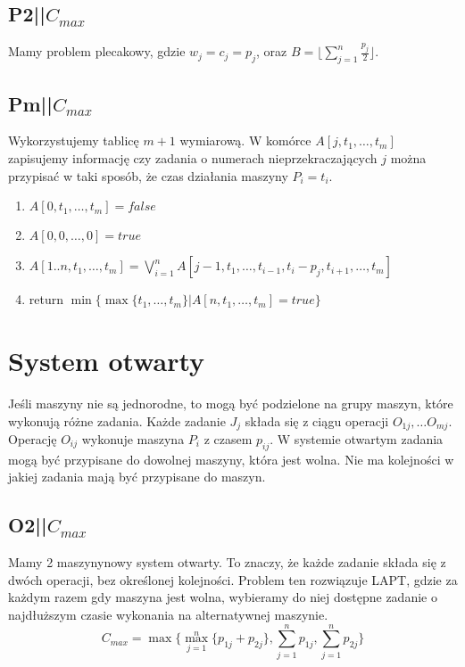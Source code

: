 \documentclass{../notatki}
\begin{document}
\subsection{P2||\texorpdfstring{$C_{max}$}{Cmax}}

Mamy problem plecakowy, gdzie $w_j = c_j = p_j$, oraz $B = \lfloor
\sum_{j=1}^{n} \frac{p_j}{2} \rfloor$.

\subsection{Pm||\texorpdfstring{$C_{max}$}{Cmax}}

Wykorzystujemy tablicę $m + 1$ wymiarową. W komórce $A[j, t_1, \dots,
t_m]$ zapisujemy informację czy zadania o numerach
nieprzekraczających $j$ można przypisać w taki sposób, że czas
działania maszyny $P_i = t_i$.

\begin{enumerate}
  \item $A[0, t_1, \dots, t_m] = false$
  \item $A[0, 0, \dots, 0] = true$
  \item $
    A[1..n, t_1, \dots, t_m] =
    \bigvee_{i=1}^{n} A[j - 1, t_1, \dots, t_{i - 1}, t_i - p_j, t_{i
    + 1}, \dots, t_m]
    $
  \item return $\min\{\max\{t_1, \dots, t_m\} | A[n, t_1, \dots, t_m] = true\}$
\end{enumerate}

\section{System otwarty}

Jeśli maszyny nie są jednorodne, to mogą być podzielone na grupy maszyn, które
wykonują różne zadania. Każde zadanie $J_j$ składa się z ciągu
operacji $O_{1j}, \dots O_{mj}$. Operację $O_{ij}$ wykonuje maszyna
$P_i$ z czasem $p_{ij}$. W systemie otwartym zadania mogą być przypisane
do dowolnej maszyny, która jest wolna. Nie ma kolejności w jakiej zadania
mają być przypisane do maszyn.

\subsection{O2||\texorpdfstring{$C_{max}$}{Cmax}}

Mamy 2 maszynynowy system otwarty. To znaczy, że każde zadanie składa się
z dwóch operacji, bez określonej kolejności. Problem ten rozwiązuje
LAPT, gdzie za każdym razem gdy maszyna jest wolna, wybieramy do niej
dostępne zadanie o najdłuższym czasie wykonania na alternatywnej maszynie.
$$
C_{max} = \max\{\max_{j=1}^{n}\{p_{1j} + p_{2j}\},
\sum_{j=1}^{n}p_{1j}, \sum_{j=1}^{n} p_{2j}\}
$$
\end{document}
